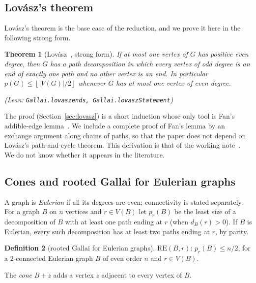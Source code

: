 \documentclass[11pt]{amsart}
\newtheorem{theorem}{Theorem}[section]
\theoremstyle{definition}
\newtheorem{definition}[theorem]{Definition}
\theoremstyle{remark}
\renewcommand{\_}{\oldunderscore\allowbreak}
\newcommand{\leanst}[1]{\par{\raggedright\small\textup{(Lean: \texttt{#1})}\par}}
\newcommand{\fl}[1]{\left\lfloor #1\right\rfloor}
\newcommand{\RE}{\mathrm{RE}}
\newcommand{\pr}{p_r}
\begin{document}
\subsection*{Lov\'asz's theorem}
Lov\'asz's theorem is the base case of the reduction, and we prove it here in the following strong
form.

\begin{theorem}[Lov\'asz~\cite{L68}, strong form]\label{thm:lovasz-intro}
If at most one vertex of $G$ has positive even degree, then $G$ has a path decomposition in which
every vertex of odd degree is an end of exactly one path and no other vertex is an end. In
particular $p(G)\le\fl{|V(G)|/2}$ whenever $G$ has at most one vertex of even degree.
\leanst{Gallai.lovasz\_ends, Gallai.lovaszStatement}
\end{theorem}

The proof (Section~\ref{sec:lovasz}) is a short induction whose only tool is Fan's addible-edge
lemma~\cite[Lemma~3.4]{Fan05}. We include a complete proof of Fan's lemma by an exchange argument
along chains of paths, so that the paper does not depend on Lov\'asz's path-and-cycle theorem. This
derivation is that of the working note~\cite{LF}. We do not know whether it appears in the
literature.

\subsection*{Cones and rooted Gallai for Eulerian graphs}
A graph is \emph{Eulerian} if all its degrees are even; connectivity is stated separately. For a
graph $B$ on $n$ vertices and $r\in V(B)$ let $\pr(B)$ be the least size of a decomposition of $B$
with at least one path ending at $r$ (when $d_B(r)>0$). If $B$ is Eulerian, every such decomposition has at least two
paths ending at $r$, by parity.

\begin{definition}[rooted Gallai for Eulerian graphs]\label{def:RE}
$\RE(B,r)$: $\pr(B)\le n/2$, for a $2$-connected Eulerian graph $B$ of even order $n$ and $r\in
V(B)$.
\end{definition}

The \emph{cone} $B+z$ adds a vertex $z$ adjacent to every vertex of $B$.
\end{document}
